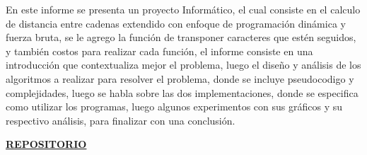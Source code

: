 En este informe se presenta un proyecto Informático, el cual consiste en el calculo de distancia entre cadenas extendido con enfoque de programación dinámica y fuerza bruta, se le agrego la función de transponer caracteres que estén seguidos, y también costos para realizar cada función, el informe consiste en una introducción que contextualiza mejor el problema, luego el diseño y análisis de los algoritmos a realizar para resolver el problema, donde se incluye pseudocodigo y complejidades, luego se habla sobre las dos implementaciones, donde se especifica como utilizar los programas, luego algunos experimentos con sus gráficos y su respectivo análisis, para finalizar con una conclusión.
\begin{center}
    \href{https://github.com/Mappo1562/DistanciaMinimaDeEdicionExtendida}{\textbf{REPOSITORIO}}    
\end{center}




